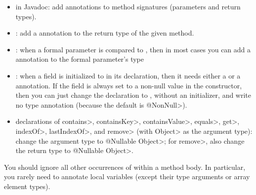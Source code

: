 \begin{itemize}
\item
  in Javadoc:  add  annotations to method signatures (parameters and return types).
\item
  :  add a  annotation to the return type
  of the given method.
\item
  :  when a formal parameter is compared to
  , then in most cases you can add a  annotation
  to the formal parameter's type
\item
  :  when a field is initialized to
   in its declaration, then it needs either a
   or a
   annotation.  If the field
  is always set to a non-null value in the constructor, then you can just
  change the declaration to , without an
  initializer, and write no type annotation (because the default is
  \<@NonNull>).
\item
  declarations of \<contains>, \<containsKey>, \<containsValue>, \<equals>,
  \<get>, \<indexOf>, \<lastIndexOf>, and \<remove> (with \<Object> as the
  argument type):
  change the argument type to \<@Nullable Object>; for \<remove>, also change
  the return type to \<@Nullable Object>.

\end{itemize}

\noindent
You should ignore all other occurrences of  within a method
body.  In particular, you rarely need to annotate local variables
(except their type arguments or array element types).

